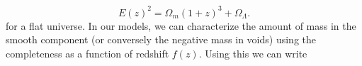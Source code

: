 \begin{equation}
E(z)^2 = \Omega_m (1 + z)^3 + \Omega_\Lambda.
\end{equation}
for a flat universe. In our models, we can characterize the amount of mass in the smooth component (or conversely the negative mass in voids)
using the completeness as a function of redshift $f(z)$. Using this we can write